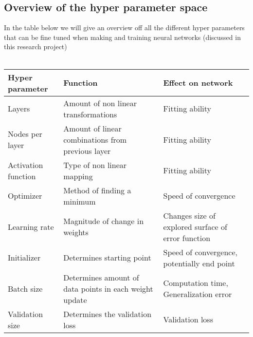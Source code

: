 \documentclass[12pt]{article}
\begin{document}
\subsection{Overview of the hyper parameter space}
In the table below we will give an overview off all the different hyper parameters that can be fine tuned when making and training neural networks (discussed in this research project)
\\
\\
\begin{center}
	\begin{tabular}{|l|p{4cm}|p{4cm}|}
		\hline
		\textbf{Hyper parameter} & \textbf{Function} & \textbf{Effect on network} \\
		\hline
		Layers & Amount of non linear transformations & Fitting ability \\
		\hline
		Nodes per layer & Amount of linear combinations from previous layer & Fitting ability \\
		\hline
		Activation function & Type of non linear mapping & Fitting ability \\
		\hline
		Optimizer & Method of finding a minimum & Speed of convergence \\
		\hline
		Learning rate & Magnitude of change in weights & Changes size of explored surface of error function \\
		\hline
		Initializer & Determines starting point & Speed of convergence, potentially end point \\
		\hline
		Batch size & Determines amount of data points in each weight update & Computation time, Generalization error \\
		\hline
		Validation size & Determines the validation loss & Validation loss \\
		\hline
	\end{tabular}
\end{center}
	
\newpage
\end{document}
